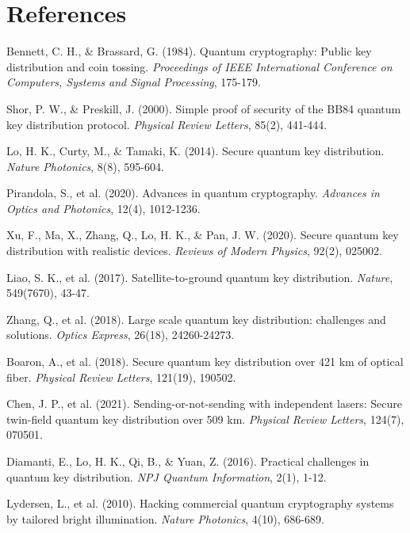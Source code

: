 \documentclass[12pt,a4paper]{article}
\begin{document}
\section*{References}

\begin{thebibliography}{15}

Bennett, C. H., \& Brassard, G. (1984). Quantum cryptography: Public key distribution and coin tossing. \textit{Proceedings of IEEE International Conference on Computers, Systems and Signal Processing}, 175-179.

Shor, P. W., \& Preskill, J. (2000). Simple proof of security of the BB84 quantum key distribution protocol. \textit{Physical Review Letters}, 85(2), 441-444.

Lo, H. K., Curty, M., \& Tamaki, K. (2014). Secure quantum key distribution. \textit{Nature Photonics}, 8(8), 595-604.

Pirandola, S., et al. (2020). Advances in quantum cryptography. \textit{Advances in Optics and Photonics}, 12(4), 1012-1236.

Xu, F., Ma, X., Zhang, Q., Lo, H. K., \& Pan, J. W. (2020). Secure quantum key distribution with realistic devices. \textit{Reviews of Modern Physics}, 92(2), 025002.

Liao, S. K., et al. (2017). Satellite-to-ground quantum key distribution. \textit{Nature}, 549(7670), 43-47.

Zhang, Q., et al. (2018). Large scale quantum key distribution: challenges and solutions. \textit{Optics Express}, 26(18), 24260-24273.

Boaron, A., et al. (2018). Secure quantum key distribution over 421 km of optical fiber. \textit{Physical Review Letters}, 121(19), 190502.

Chen, J. P., et al. (2021). Sending-or-not-sending with independent lasers: Secure twin-field quantum key distribution over 509 km. \textit{Physical Review Letters}, 124(7), 070501.

Diamanti, E., Lo, H. K., Qi, B., \& Yuan, Z. (2016). Practical challenges in quantum key distribution. \textit{NPJ Quantum Information}, 2(1), 1-12.

Lydersen, L., et al. (2010). Hacking commercial quantum cryptography systems by tailored bright illumination. \textit{Nature Photonics}, 4(10), 686-689.


\end{thebibliography}
\end{document}
